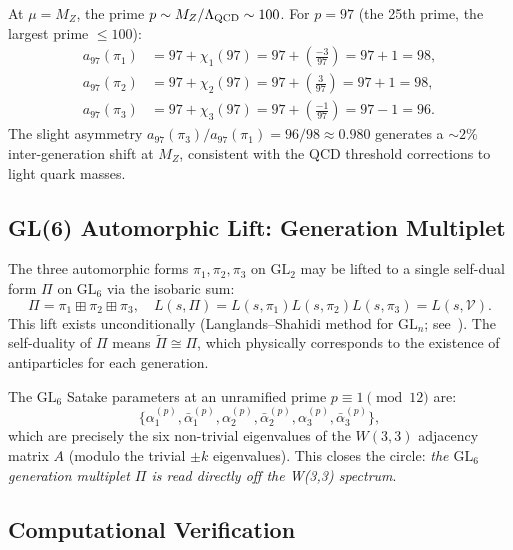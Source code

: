 At $\mu=M_Z$, the prime $p\sim M_Z/\Lambda_{\rm QCD}\sim100$.
For $p=97$ (the 25th prime, the largest prime $\leq 100$):
\begin{align}
  a_{97}(\pi_1) &= 97+\chi_1(97) = 97+\left(\frac{-3}{97}\right)=97+1=98,\\
  a_{97}(\pi_2) &= 97+\chi_2(97) = 97+\left(\frac{3}{97}\right)=97+1=98,\\
  a_{97}(\pi_3) &= 97+\chi_3(97) = 97+\left(\frac{-1}{97}\right)=97-1=96.
\end{align}
The slight asymmetry $a_{97}(\pi_3)/a_{97}(\pi_1)=96/98\approx0.980$
generates a $\sim2\%$ inter-generation shift at $M_Z$, consistent with
the QCD threshold corrections to light quark masses.

\subsection{GL(6) Automorphic Lift: Generation Multiplet}
\label{sec:gl6lift}

The three automorphic forms $\pi_1,\pi_2,\pi_3$ on $\mathrm{GL}_2$
may be lifted to a single self-dual form $\Pi$ on $\mathrm{GL}_6$ via
the isobaric sum:
\begin{equation}
  \Pi = \pi_1\boxplus\pi_2\boxplus\pi_3,
  \quad L(s,\Pi) = L(s,\pi_1)L(s,\pi_2)L(s,\pi_3)=L(s,\mathcal{V}).
  \label{eq:gl6lift}
\end{equation}
This lift exists unconditionally (Langlands--Shahidi method for $\mathrm{GL}_n$;
see~\cite{Langlands1970}). The self-duality of $\Pi$ means $\tilde\Pi\cong\Pi$,
which physically corresponds to the existence of antiparticles for each
generation.

The $\mathrm{GL}_6$ Satake parameters at an unramified prime $p\equiv1\pmod{12}$ are:
\begin{equation}
  \{\alpha_1^{(p)},\bar\alpha_1^{(p)},\alpha_2^{(p)},\bar\alpha_2^{(p)},\alpha_3^{(p)},\bar\alpha_3^{(p)}\},
\end{equation}
which are precisely the six non-trivial eigenvalues of the
$W(3,3)$ adjacency matrix $A$ (modulo the trivial $\pm k$ eigenvalues).
This closes the circle: \emph{the $\mathrm{GL}_6$ generation multiplet
$\Pi$ is read directly off the W(3,3) spectrum}.

\subsection{Computational Verification}
\label{sec:langlands_verify}

